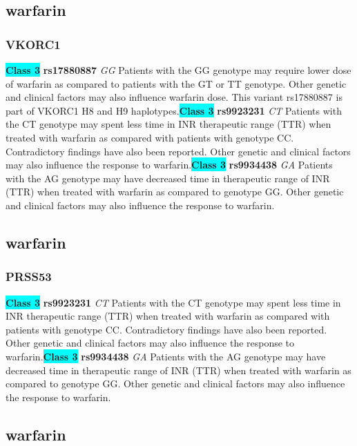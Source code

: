 \documentclass{book}
\begin{document}
\begin{center}



\end{center}\subsection{ warfarin }


\subsubsection{ VKORC1 }

\begin{center}
\textbf{\colorbox{cyan} {Class 3}} \textbf{ rs17880887 } \textit{ GG }
Patients with the GG genotype may require lower dose of warfarin as compared to patients with the GT or TT genotype. Other genetic and clinical factors may also influence warfarin dose. This variant rs17880887 is part of VKORC1 H8 and H9 haplotypes.\textbf{\colorbox{cyan} {Class 3}} \textbf{ rs9923231 } \textit{ CT }
Patients with the CT genotype may spent less time in INR therapeutic range (TTR) when treated with warfarin as compared with patients with genotype CC. Contradictory findings have also been reported. Other genetic and clinical factors may also influence the response to warfarin.\textbf{\colorbox{cyan} {Class 3}} \textbf{ rs9934438 } \textit{ GA }
Patients with the AG genotype may have decreased time in therapeutic range of INR (TTR) when treated with warfarin as compared to genotype GG. Other genetic and clinical factors may also influence the response to warfarin.


\end{center}\subsection{ warfarin }


\subsubsection{ PRSS53 }

\begin{center}
\textbf{\colorbox{cyan} {Class 3}} \textbf{ rs9923231 } \textit{ CT }
Patients with the CT genotype may spent less time in INR therapeutic range (TTR) when treated with warfarin as compared with patients with genotype CC. Contradictory findings have also been reported. Other genetic and clinical factors may also influence the response to warfarin.\textbf{\colorbox{cyan} {Class 3}} \textbf{ rs9934438 } \textit{ GA }
Patients with the AG genotype may have decreased time in therapeutic range of INR (TTR) when treated with warfarin as compared to genotype GG. Other genetic and clinical factors may also influence the response to warfarin.


\end{center}\subsection{ warfarin }
\end{document}
